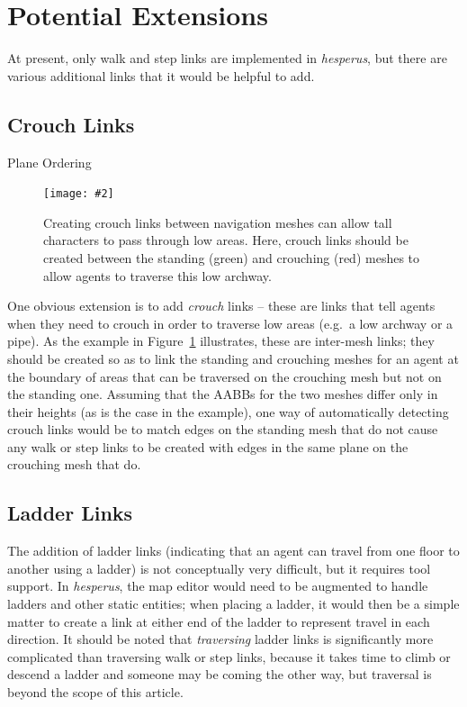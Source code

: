 \documentclass[10pt,twocolumn]{article}
\newcommand{\stufigex}[5]					%
{
	\begin{figure}[#5]
	\begin{center}
		\texttt{[image: \#2]}
		\caption{#3}
		\label{#4}
	\end{center}
	\end{figure}
}
\begin{document}
\section{Potential Extensions}

At present, only walk and step links are implemented in \emph{hesperus}, but there are various additional links that it would be helpful to add.

\subsection{Crouch Links}

\begin{stulisting}[!t]
\caption{Plane Ordering}
\label{code:plane-ordering}

\end{stulisting}

\stufigex{width=.9\linewidth}{crouchlinks.png}{Creating crouch links between navigation meshes can allow tall characters to pass through low areas. Here, crouch links should be created between the standing (green) and crouching (red) meshes to allow agents to traverse this low archway.}{fig:crouchlinks}{t}

One obvious extension is to add \emph{crouch} links -- these are links that tell agents when they need to crouch in order to traverse low areas (e.g.~a low archway or a pipe). As the example in Figure~\ref{fig:crouchlinks} illustrates, these are inter-mesh links; they should be created so as to link the standing and crouching meshes for an agent at the boundary of areas that can be traversed on the crouching mesh but not on the standing one. Assuming that the AABBs for the two meshes differ only in their heights (as is the case in the example), one way of automatically detecting crouch links would be to match edges on the standing mesh that do not cause any walk or step links to be created with edges in the same plane on the crouching mesh that do.

\subsection{Ladder Links}

The addition of ladder links (indicating that an agent can travel from one floor to another using a ladder) is not conceptually very difficult, but it requires tool support. In \emph{hesperus}, the map editor would need to be augmented to handle ladders and other static entities; when placing a ladder, it would then be a simple matter to create a link at either end of the ladder to represent travel in each direction. It should be noted that \emph{traversing} ladder links is significantly more complicated than traversing walk or step links, because it takes time to climb or descend a ladder and someone may be coming the other way, but traversal is beyond the scope of this article.
\end{document}
